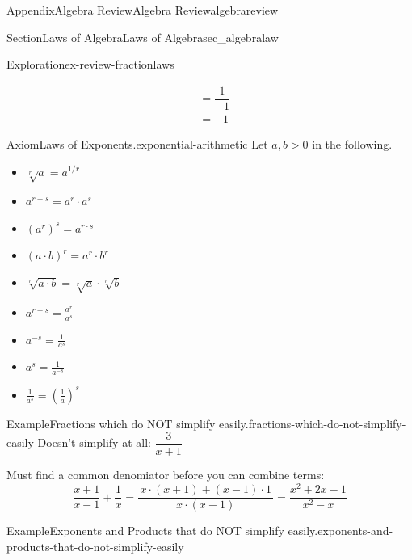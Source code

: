 \documentclass[oneside,10pt,]{tufte-book}
\numberwithin{equation}{chapter}
\newcommand{\amp}{&}
\begin{document}
\begin{appendixptx}{Appendix}{Algebra Review}{}{Algebra Review}{}{}{algebrareview}
\begin{sectionptx}{Section}{Laws of Algebra}{}{Laws of Algebra}{}{}{sec_algebralaw}
\begin{exploration}{Exploration}{}{ex-review-fractionlaws}
\begin{enumerate}[font=\bfseries,label=(\alph*),ref=\alph*]
\begin{align*}
\amp = \dfrac{1}{-1}\\
\amp = -1
\end{align*}
%
\end{enumerate}%
\end{exploration}%
\begin{axiom}{Axiom}{Laws of Exponents.}{}{exponential-arithmetic}%
Let \(a,b> 0\) in the following.%
\begin{sidebyside}{2}{0.1}{0.1}{0}%
\begin{sbspanel}{0.4}%
%
\begin{itemize}[label=$\circ$]
\item{}\(\displaystyle \sqrt[r]{a}=  a^{1/r}\)%
\item{}\(\displaystyle a^{r+s} =  a^r\cdot a^s \)%
\item{}\(\displaystyle {\left(a^{r}\right)}^s=  a^{r\cdot s}\)%
\item{}\(\displaystyle {\left(a\cdot b\right)}^{r}=  a^{r}\cdot b^{r}\)%
\item{}\(\displaystyle \sqrt[r]{a\cdot b}=  \sqrt[r]{a}\cdot \sqrt[r]{b}\)%
\end{itemize}
\end{sbspanel}%
\begin{sbspanel}{0.4}%
%
\begin{itemize}[label=$\circ$]
\item{}\(\displaystyle a^{r-s}=  \frac{a^r}{a^s}\)%
\item{}\(\displaystyle a^{-s}=  \frac{1}{a^s}\)%
\item{}\(\displaystyle a^{s}=  \frac{1}{a^{-s}}\)%
\item{}\(\displaystyle \frac{1}{a^{s}} =  \left(\frac{1}{a}\right)^s\)%
\end{itemize}
\end{sbspanel}%
\end{sidebyside}%
\end{axiom}
\begin{example}{Example}{Fractions which do NOT simplify easily.}{fractions-which-do-not-simplify-easily}%
Doesn't simplify at all: \(\dfrac{3}{x+1}\)%
\par
Must find a common denomiator before you can combine terms:%
\begin{equation*}
\dfrac{x+1}{x-1} + \dfrac{1}{x} = \dfrac{\,x\cdot (x+1) + (x-1)\cdot 1\,}{x\cdot (x-1)} = \dfrac{x^2+2x-1}{x^2-x}
\end{equation*}
%
\end{example}
\begin{example}{Example}{Exponents and Products that do NOT simplify easily.}{exponents-and-products-that-do-not-simplify-easily}%

\end{example}
\end{sectionptx}
\end{appendixptx}
\end{document}
